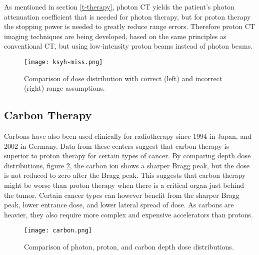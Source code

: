 \documentclass[../main/thesis.tex]{subfiles}
\begin{document}
As mentioned in section \ref{t-therapy}, photon \gls{CT} yields the patient's photon attenuation coefficient that is needed for photon therapy, but for proton therapy the stopping power is needed to greatly reduce range errors. Therefore proton \gls{CT} imaging techniques are being developed, based on the same principles as conventional \gls{CT}, but using low-intensity proton beams instead of photon beams. \citep{proton-ct}


\begin{figure}[h]
	\centering
	\texttt{[image: ksyh-miss.png]}
	\caption{Comparison of dose distribution with correct (left) and incorrect (right) range assumptions. \citep{ksyh-phys251}}
	\label{fig-miss}
\end{figure}


\newpage
\subsection{Carbon Therapy}
\label{t-carbon}
Carbons have also been used clinically for radiotherapy since 1994 in Japan, and 2002 in Germany. Data from these centers suggest that carbon therapy is superior to proton therapy for certain types of cancer. By comparing depth dose distributions, figure \ref{fig-carbon}, the carbon ion shows a sharper Bragg peak, but the dose is not reduced to zero after the Bragg peak. This suggests that carbon therapy might be worse than proton therapy when there is a critical organ just behind the tumor. Certain cancer types can however benefit from the sharper Bragg peak, lower entrance dose, and lower lateral spread of dose. As carbons are heavier, they also require more complex and expensive accelerators than protons. \citep{ksyh-phys251}

\begin{figure}[h]
	\centering
	\texttt{[image: carbon.png]}
	\caption{Comparison of photon, proton, and carbon depth dose distributions. \citep{ksyh-phys251}}
	\label{fig-carbon}
\end{figure}
\end{document}
